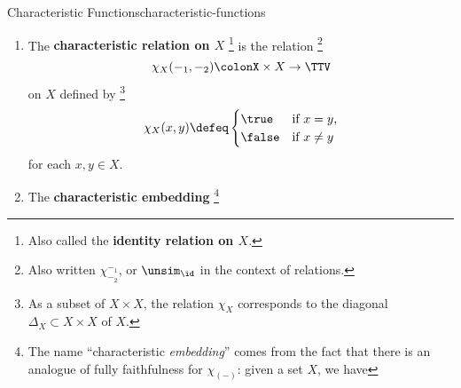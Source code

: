 \begin{definition}{Characteristic Functions}{characteristic-functions}
\begin{enumerate}
            defined by%
            \[
                \chi_{x}
                \defeq
                \chi_{\{x\}},%
            \]%
            i.e.\ by%
            \[
                \chi_{x}(y)
                \defeq
                \begin{cases}
                    \true  &\text{if $x=y$,}\\
                    \false &\text{if $x\neq y$}
                \end{cases}
            \]%
            for each $y\in X$.
        \item\label{characteristic-functions-characteristic-relation}The \textbf{characteristic relation on $X$}%
            \footnote{%
                Also called the \textbf{identity relation on $X$}.
            } %
            is the relation%
            \footnote{%
                Also written $\chi^{-_{1}}_{-_{2}}$, or $\unsim_{\id}$ in the context of relations.
            }%
            \[%
                \chi_{X}(-_{1},-_{2})%
                \colon%
                X\times X%
                \to%
                \TTV%
            \]%
            on $X$ defined by%
            \footnote{%
                As a subset of $X\times X$, the relation $\chi_{X}$ corresponds to the diagonal $\Delta_{X}\subset X\times X$ of $X$.
            }%
            \[
                \chi_{X}(x,y)
                \defeq
                \begin{cases}
                    \true  &\text{if $x=y$,}\\
                    \false &\text{if $x\neq y$}
                \end{cases}
            \]%
            for each $x,y\in X$.
        \item\label{characteristic-functions-characteristic-embedding}The \textbf{characteristic embedding}%
            \footnote{%
                The name ``characteristic \emph{embedding}'' comes from the fact that there is an analogue of fully faithfulness for $\chi_{(-)}$: given a set $X$, we have
}
\end{enumerate}
\end{definition}
